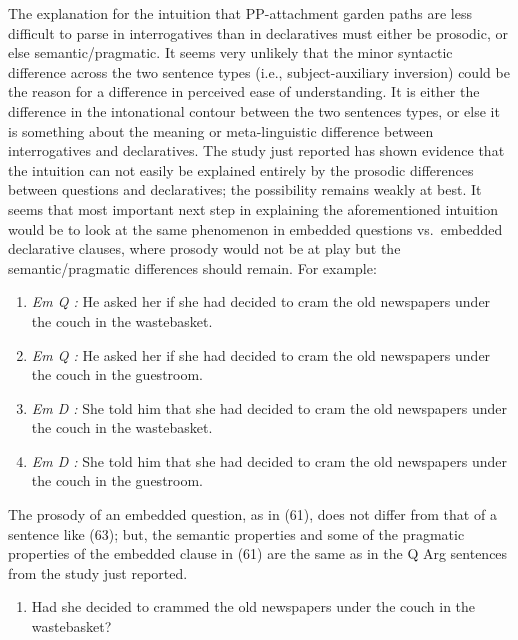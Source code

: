 \documentclass[12pt,oneside]{book}
\providecommand{\tightlist}{%
  \setlength{\itemsep}{0pt}\setlength{\parskip}{0pt}}
\begin{document}
The explanation for the intuition that PP-attachment garden paths are less difficult to parse in interrogatives than in declaratives must either be prosodic, or else semantic/pragmatic. It seems very unlikely that the minor syntactic difference across the two sentence types (i.e., subject-auxiliary inversion) could be the reason for a difference in perceived ease of understanding. It is either the difference in the intonational contour between the two sentences types, or else it is something about the meaning or meta-linguistic difference between interrogatives and declaratives. The study just reported has shown evidence that the intuition can not easily be explained entirely by the prosodic differences between questions and declaratives; the possibility remains weakly at best. It seems that most important next step in explaining the aforementioned intuition would be to look at the same phenomenon in embedded questions vs.~embedded declarative clauses, where prosody would not be at play but the semantic/pragmatic differences should remain. For example:

\begin{enumerate}
\def\labelenumi{(\arabic{enumi})}
\setcounter{enumi}{60}
\item
  \emph{Em Q :} He asked her if she had decided to cram the old newspapers under the couch in the wastebasket.
\item
  \emph{Em Q :} He asked her if she had decided to cram the old newspapers under the couch in the guestroom.
\item
  \emph{Em D :} She told him that she had decided to cram the old newspapers under the couch in the wastebasket.
\item
  \emph{Em D :} She told him that she had decided to cram the old newspapers under the couch in the guestroom.
\end{enumerate}

The prosody of an embedded question, as in (61), does not differ from that of a sentence like (63); but, the semantic properties and some of the pragmatic properties of the embedded clause in (61) are the same as in the Q Arg sentences from the study just reported.

\begin{enumerate}
\def\labelenumi{(\arabic{enumi})}
\setcounter{enumi}{64}
\tightlist
\item
  Had she decided to crammed the old newspapers under the couch in the wastebasket?
\end{enumerate}
\end{document}

